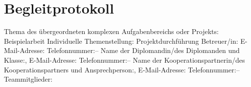 \chapter*{Begleitprotokoll}
\begin{flushleft}
	
	\small
	Thema des übergeordneten komplexen Aufgabenbereichs oder Projekts:
	\linebreak
	\Large
	Beispielarbeit
	\vskip0pt
	\small
	Individuelle Themenstellung:
	\linebreak
	\Large
	Projektdurchführung
	\vskip15pt
	\small
	Betreuer/in:{\large\tabto{4cm}\ThSupervisorName}\linebreak
	E-Mail-Adresse:{\large\tabto{4cm}\ThSupervisorEmail}\linebreak
	Telefonnummer:{\large\tabto{4cm}--}\linebreak
	\vskip15pt
	\small
	Name der Diplomandin/des Diplomanden und Klasse:{\large\tabto{4cm}\ThRealAuthorNameOne, \ThAuthorsClass}\linebreak
	E-Mail-Adresse:{\large\tabto{4cm}\ThRealAuthorNameOne}\linebreak
	Telefonnummer:{\large\tabto{4cm}--}\linebreak
	\vskip15pt
	\small
	Name der Kooperationspartnerin/des Kooperationspartners und Ansprechperson:{\large\tabto{4cm}\ThPartnerName, \ThPartnerPersonName}\linebreak
	E-Mail-Adresse:{\large\tabto{4cm}\ThPartnerPersonEmail}\linebreak
	Telefonnummer:{\large\tabto{4cm}--}\linebreak
	\vskip15pt
	\small
	Teammitglieder:{\large\tabto{4cm}\ThRealAuthorNameOne}
	\vskip15pt
	\fontsize{10pt}{10pt}
	\selectfont
	

\end{flushleft}
